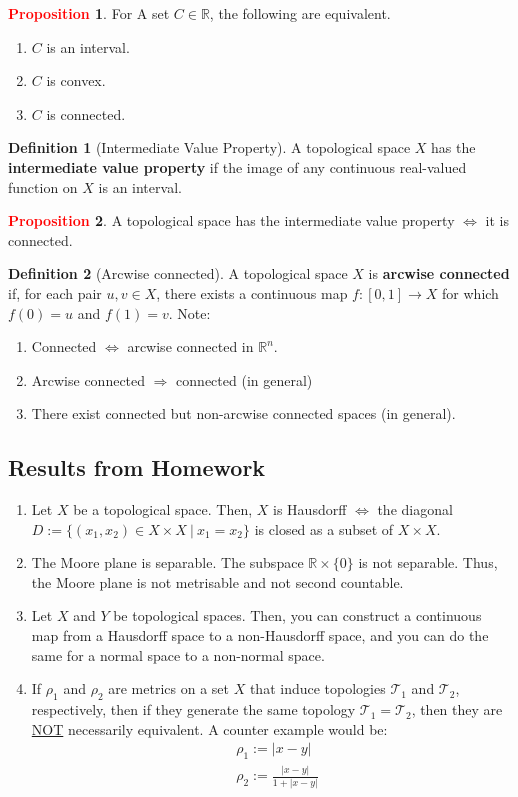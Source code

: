 \documentclass[11pt]{article}
\newcommand{\topo}[0]{\mathcal{T}}
\theoremstyle{definition}
\theoremstyle{definition}
\newcommand{\R}[0]{\mathbb{R}}
\theoremstyle{definition}
\newtheorem{definition}{\textcolor{OliveGreen}{Definition}}
\newtheorem{prop}{\textcolor{red}{Proposition}}
\theoremstyle{remark}
\begin{document}
\begin{prop}
	For A set $C \in \R$, the following are equivalent. 
	\begin{enumerate}[noitemsep]
		\item $C$ is an interval. 
		\item $C$ is convex. 
		\item $C$ is connected. 
	\end{enumerate}
\end{prop}

\begin{definition}[Intermediate Value Property]
	A topological space $X$ has the \textbf{intermediate value property} if the image of any continuous real-valued function on $X$ is an interval. 
\end{definition}

\begin{prop}
	A topological space has the intermediate value property $\iff$ it is connected. 
\end{prop}

\begin{definition}[Arcwise connected]
	A topological space $X$ is \textbf{arcwise connected} if, for each pair $u, v \in X$, there exists a continuous map $f: [0,1] \rightarrow X$ for which $f(0) = u$ and $f(1) = v$. Note: 
	\begin{enumerate}[noitemsep]
		\item Connected $\iff$ arcwise connected in $\R^n$. 
		\item Arcwise connected $\Rightarrow$ connected (in general) 
		\item There exist connected but non-arcwise connected spaces (in general). 
	\end{enumerate}
\end{definition}

\subsection{Results from Homework}
\begin{enumerate}[noitemsep]
	\item Let $X$ be a topological space. Then, $X$ is Hausdorff $\iff$ the diagonal $D:= \{ (x_1, x_2) \in X \times X\ |\ x_1 = x_2 \}$ is closed as a subset of $X \times X$. 
	\item The Moore plane is separable. The subspace $\R \times \{ 0 \}$ is not separable. Thus, the Moore plane is not metrisable and not second countable. 
	\item Let $X$ and $Y$ be topological spaces. Then, you can construct a continuous map from a Hausdorff space to a non-Hausdorff space, and you can do the same for a normal space to a non-normal space.
	\item If $\rho_1$ and $\rho_2$ are metrics on a set $X$ that induce topologies $\topo_1$ and $\topo_2$, respectively, then if they generate the same topology $\topo_1 = \topo_2$, then they are \underline{NOT} necessarily equivalent. A counter example would be: 
	\begin{align*}
		& \rho_1 := |x-y| \\
		& \rho_2 := \frac{|x-y|}{1 + |x-y|}
	\end{align*} 
\end{enumerate}
\end{document}
